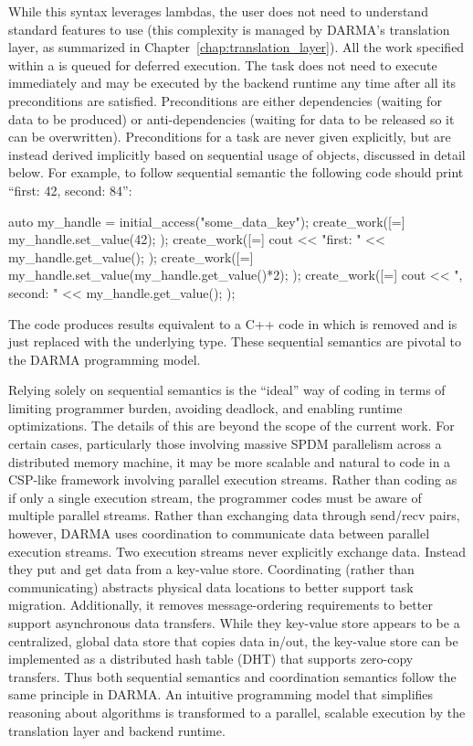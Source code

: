 While this syntax leverages  lambdas, the user does not need to understand  standard features to use  (this
complexity is managed by DARMA's translation layer, as summarized in Chapter~\ref{chap:translation_layer}). 
All the work specified within a  is queued for deferred execution. 
The task does not need to execute immediately and may be executed by the backend runtime any time after all its preconditions are satisfied. 
Preconditions are either dependencies (waiting for data to be produced) or anti-dependencies (waiting for data to be released so it can be overwritten).   
Preconditions for a task are never given explicitly, but are instead derived implicitly based on sequential usage of  objects, discussed in detail below.
For example, to follow sequential semantic the following code should print ``first: 42, second: 84'':
\begin{CppCode}
auto my_handle = initial_access("some_data_key");
create_work([=]{
  my_handle.set_value(42);
});
create_work([=]{
  cout << "first: " << my_handle.get_value();
});
create_work([=]{
  my_handle.set_value(my_handle.get_value()*2);
});
create_work([=]{
  cout << ", second: " << my_handle.get_value();
});
\end{CppCode}
The code produces results equivalent to a C++ code in which  is removed and  is just replaced with the underlying type.
These sequential semantics are pivotal to the DARMA programming model.

Relying solely on sequential semantics is the ``ideal'' way of coding in terms of limiting programmer burden, avoiding deadlock, and enabling runtime optimizations.
The details of this are beyond the scope of the current work.
For certain cases, particularly those involving massive SPDM parallelism across a distributed memory machine,
it may be more scalable and natural to code in a CSP-like framework involving parallel execution streams.
Rather than coding as if only a single execution stream, the programmer codes must be aware of multiple parallel streams.
Rather than exchanging data through send/recv pairs, however, DARMA uses coordination to communicate data between parallel execution streams.
Two execution streams never explicitly exchange data. Instead they put and get data from a key-value store.
Coordinating (rather than communicating) abstracts physical data locations to better support task migration.
Additionally, it removes message-ordering requirements to better support asynchronous data transfers.
While they key-value store appears to be a centralized, global data store that copies data in/out,
the key-value store can be implemented as a distributed hash table (DHT) that supports zero-copy transfers.
Thus both sequential semantics and coordination semantics follow the same principle in DARMA.
An intuitive programming model that simplifies reasoning about algorithms is transformed to a parallel, scalable execution by the translation layer and backend runtime.

